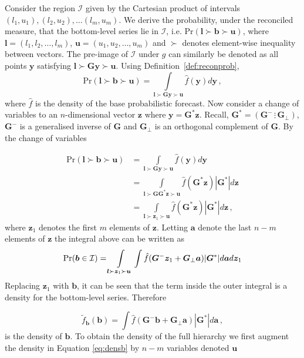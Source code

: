 \documentclass[12pt]{article}
\theoremstyle{definition}
\begin{document}
Consider the region $\mathcal{I}$ given by the Cartesian product of intervals $(l_1,u_1),(l_2,u_2),\ldots(l_m,u_m)$.  We derive the probability, under the reconciled measure, that the bottom-level series lie in $\mathcal{I}$, i.e. $\mbox{Pr}(\bm{l}\succ\bm{b}\succ\bm{u})$, where ${\bm l}=(l_1,l_2,\ldots,l_m)$, ${\bm u}=(u_1,u_2,\ldots,u_m)$ and $\succ$ denotes element-wise inequality between vectors.  The pre-image of $\mathcal{I}$ under $g$ can similarly be denoted as all points ${\bm y}$ satisfying $\bm{l}\succ\bm{G}\bm{y}\succ\bm{u}$.  Using Definition~\ref{def:reconprob},
\[
\mbox{Pr}(\bm{l}\succ\bm{b}\succ\bm{u})=\int\limits_{\bm{l}\succ\bm{G}\bm{y}\succ\bm{u}}\hat{f}(\bm{y})d{\bm y}\,,
\]
where $\hat{f}$ is the density of the base probabilistic forecast.  Now consider a change of variables to an $n$-dimensional vector ${\bm z}$ where $\bm{y}={\bm G^*}{\bm z}$. Recall, ${\bm G^*}=\left({\bm G^{-}}\,\vdots\,{\bm G_\perp}\right)$, ${\bm G^{-}}$ is a generalised inverse of $\bm{G}$ and ${\bm G_\perp}$ is an orthogonal complement of $\bm{G}$.  By the change of variables

\begin{align}
\mbox{Pr}(\bm{l}\succ\bm{b}\succ\bm{u})&=\int\limits_{\bm{l}\succ\bm{G}\bm{y}\succ\bm{u}}\hat{f}(\bm{y})d{\bm y}\nonumber\\
&=\int\limits_{\bm{l}\succ\bm{G}\bm{G}^*\bm{z}\succ\bm{u}}\hat{f}(\bm{G}^*\bm{z})|\bm{G}^*|d{\bm z}\nonumber\\
&=\int\limits_{\bm{l}\succ\bm{z}_1\succ\bm{u}}\hat{f}(\bm{G}^*\bm{z})|\bm{G}^*|d{\bm z}\nonumber\,,
\end{align}
where $\bm{z}_1$ denotes the first $m$ elements of $\bm z$.  Letting $\bm{a}$ denote the last $n-m$ elements of $\bm{z}$ the integral above can be written as
\[
\mbox{Pr}({\bm b}\in \mathcal{I})=\int\limits_{\bm{l}\succ\bm{z}_1\succ\bm{u}}\int\hat{f}(\bm{G}^{-}\bm{z}_1+\bm{G}_{\perp}\bm{a})|\bm{G}^*|d{\bm a}d{\bm z}_1\nonumber\\
\]
Replacing ${\bm z}_1$ with ${\bm b}$, it can be seen that the term inside the outer integral is a density for the bottom-level series. Therefore

\begin{equation}
\tilde{f}_{\bm{b}}(\bm{b})=\int\hat{f}(\bm{G}^{-}\bm{b}+\bm{G}_{\perp}\bm{a})|\bm{G}^*|d{\bm a}\,,
\label{eq:densb}
\end{equation}
is the density of ${\bm b}$. To obtain the density of the full hierarchy we first augment the density in Equation \eqref{eq:densb} by $n-m$ variables denoted $\bm{u}$
\end{document}
